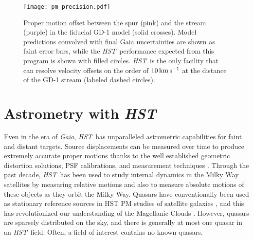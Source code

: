 \documentclass[12pt]{article}
\newcommand{\hst}{\textsl{HST}}
\newcommand{\gaia}{\textsl{Gaia}}
\begin{document}
\begin{figure}
\begin{center}
\texttt{[image: pm\_precision.pdf]}
\end{center}
\caption{
Proper motion offset between the spur (pink) and the stream (purple) in the fiducial GD-1 model (solid crosses).
Model predictions convolved with final Gaia uncertainties are shown as faint error bars, while the \hst\ performance expected from this program is shown with filled circles.
\hst\ is the only facility that can resolve velocity offsets on the order of $10\,\rm km\,s^{-1}$ at the distance of the GD-1 stream (labeled dashed circles).
}
\label{fig:precision}
\end{figure}


%
%
\describeobservations   %
\section*{Astrometry with \hst}
Even in the era of \gaia, \hst\ has unparalleled astrometric capabilities for faint and distant targets.
Source displacements can be measured over time to produce extremely accurate proper motions thanks to the well established geometric distortion solutions, PSF calibrations, and measurement techniques \parencite[e.g.,][]{anderson2003}.
Through the past decade, \hst\ has been used to study internal dynamics in the Milky Way satellites by measuring relative motions \parencite[e.g., ][]{anderson2010} and also to measure absolute motions of these objects as they orbit the Milky Way.
Quasars have conventionally been used as stationary reference sources in HST PM studies of satellite galaxies \parencite[e.g.,][]{kallivayalil2006, kallivayalil2013, piatek2008}, and this has revolutionized our understanding of the Magellanic Clouds \parencite{besla2007}.
However, quasars are sparsely distributed on the sky, and there is generally at most one quasar in an \hst\ field.
Often, a field of interest contains no known quasars.
\end{document}
